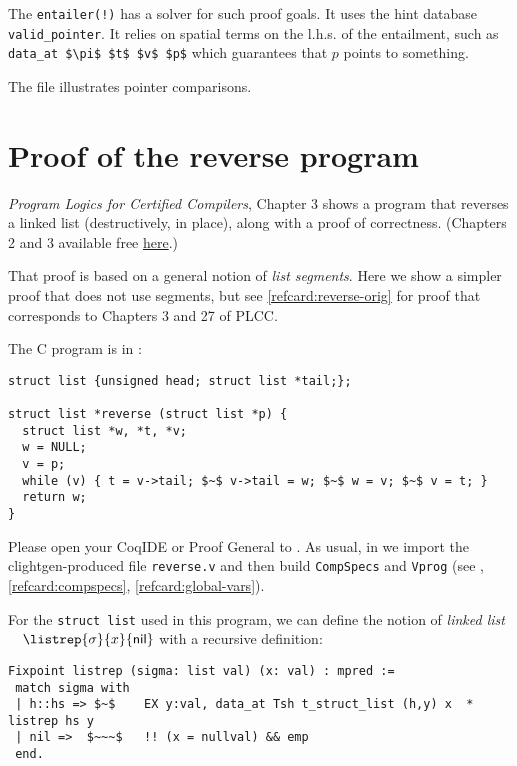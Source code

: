 \documentclass[12pt,fleqn,openany,oneside,showtrims]{memoir}
\begin{document}
The \lstinline{entailer(!)} has a solver for such proof goals.
It uses the hint database \lstinline{valid_pointer}.
It relies on spatial terms on the l.h.s. of the entailment,
such as \lstinline{data_at $\pi$ $t$ $v$ $p$} which guarantees
that $p$ points to something.

The file  illustrates pointer comparisons.

\chapter{Proof of the \textsf{reverse} program}

\emph{Program Logics for Certified Compilers},
Chapter 3
shows a program that reverses a linked list (destructively, in place),
along with a proof of correctness.
(Chapters 2 and 3 available free
\href{http://vst.cs.princeton.edu/download/PLCC-to-chapter-3.pdf#page=20}{here}.)

That proof is based on a general notion of \emph{list segments}.
Here we show a simpler proof that does not use segments, but see
\autoref{refcard:reverse-orig} for proof that corresponds
to Chapters 3 and 27 of PLCC.

The C program is in :
\begin{lstlisting}
struct list {unsigned head; struct list *tail;};

struct list *reverse (struct list *p) {
  struct list *w, *t, *v;
  w = NULL;
  v = p;
  while (v) { t = v->tail; $~$ v->tail = w; $~$ w = v; $~$ v = t; }
  return w;
}
\end{lstlisting}
\vspace{-2ex}

Please open your CoqIDE or Proof General to
.
As usual, in 
we import the clightgen-produced file
\lstinline{reverse.v} and then build \lstinline{CompSpecs} and \lstinline{Vprog}
(see , \autoref{refcard:compspecs},
\autoref{refcard:global-vars}).

For the \lstinline{struct list} used in this program,
we can define the notion of \emph{linked list}
~~$\listrep{\sigma}{x}{\mathsf{nil}}$
with a recursive definition:

\begin{lstlisting}
Fixpoint listrep (sigma: list val) (x: val) : mpred :=
 match sigma with
 | h::hs => $~$    EX y:val, data_at Tsh t_struct_list (h,y) x  * listrep hs y
 | nil =>  $~~~$   !! (x = nullval) && emp
 end.
\end{lstlisting}
\end{document}
